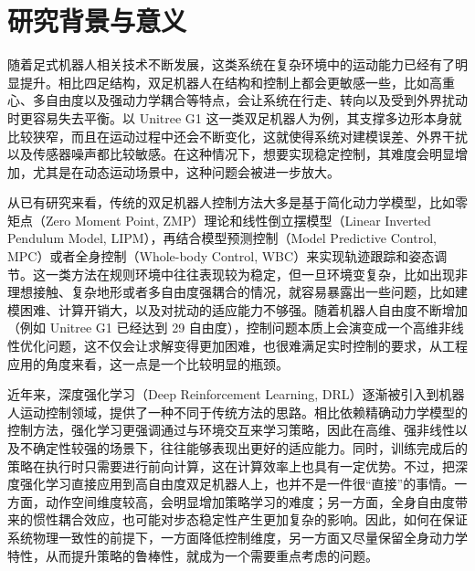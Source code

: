 
\raggedbottom

\section{研究背景与意义}
随着足式机器人相关技术不断发展，这类系统在复杂环境中的运动能力已经有了明显提升。相比四足结构，双足机器人在结构和控制上都会更敏感一些，比如高重心、多自由度以及强动力学耦合等特点，会让系统在行走、转向以及受到外界扰动时更容易失去平衡。以 Unitree G1 这一类双足机器人为例，其支撑多边形本身就比较狭窄，而且在运动过程中还会不断变化，这就使得系统对建模误差、外界干扰以及传感器噪声都比较敏感。在这种情况下，想要实现稳定控制，其难度会明显增加，尤其是在动态运动场景中，这种问题会被进一步放大。

从已有研究来看，传统的双足机器人控制方法大多是基于简化动力学模型，比如零矩点（Zero Moment Point, ZMP）理论和线性倒立摆模型（Linear Inverted Pendulum Model, LIPM）\cite{Kajita2003}，再结合模型预测控制（Model Predictive Control, MPC）\cite{Kuindersma2016}或者全身控制（Whole-body Control, WBC）\cite{Sentis2010}来实现轨迹跟踪和姿态调节。这一类方法在规则环境中往往表现较为稳定，但一旦环境变复杂，比如出现非理想接触、复杂地形或者多自由度强耦合的情况，就容易暴露出一些问题，比如建模困难、计算开销大，以及对扰动的适应能力不够强。随着机器人自由度不断增加（例如 Unitree G1 已经达到 29 自由度），控制问题本质上会演变成一个高维非线性优化问题，这不仅会让求解变得更加困难，也很难满足实时控制的要求，从工程应用的角度来看，这一点是一个比较明显的瓶颈。

近年来，深度强化学习（Deep Reinforcement Learning, DRL）逐渐被引入到机器人运动控制领域，提供了一种不同于传统方法的思路。相比依赖精确动力学模型的控制方法，强化学习更强调通过与环境交互来学习策略，因此在高维、强非线性以及不确定性较强的场景下，往往能够表现出更好的适应能力。同时，训练完成后的策略在执行时只需要进行前向计算，这在计算效率上也具有一定优势。不过，把深度强化学习直接应用到高自由度双足机器人上，也并不是一件很“直接”的事情。一方面，动作空间维度较高，会明显增加策略学习的难度；另一方面，全身自由度带来的惯性耦合效应，也可能对步态稳定性产生更加复杂的影响。因此，如何在保证系统物理一致性的前提下，一方面降低控制维度，另一方面又尽量保留全身动力学特性，从而提升策略的鲁棒性，就成为一个需要重点考虑的问题。

